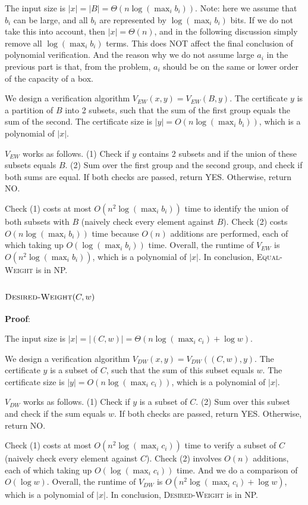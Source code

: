 \documentclass{article}
\begin{document}
The input size is $|x|=|B|=\Theta(n\log(\max_ib_i))$. Note: here we assume that $b_i$ can be large, and all $b_i$ are represented by $\log(\max_ib_i)$ bits. If we do not take this into account, then $|x|=\Theta(n)$, and in the following discussion simply remove all $\log(\max_ib_i)$ terms. This does NOT affect the final conclusion of polynomial verification. And the reason why we do not assume large $a_i$ in the previous part is that, from the problem, $a_i$ should be on the same or lower order of the capacity of a box.

We design a verification algorithm $V_{EW}(x,y)=V_{EW}(B,y)$. The certificate $y$ is a partition of $B$ into 2 subsets, such that the sum of the first group equals the sum of the second. The certificate size is $|y|=O(n\log(\max_ib_i))$, which is a polynomial of $|x|$.

$V_{EW}$ works as follows. (1) Check if $y$ contains 2 subsets and if the union of these subsets equals $B$. (2) Sum over the first group and the second group, and check if both sums are equal. If both checks are passed, return YES. Otherwise, return NO.

Check (1) costs at most $O(n^2\log(\max_ib_i))$ time to identify the union of both subsets with $B$ (naively check every element against $B$). Check (2) costs $O(n\log(\max_ib_i))$ time because $O(n)$ additions are performed, each of which taking up $O(\log(\max_ib_i))$ time. Overall, the runtime of $V_{EW}$ is $O(n^2\log(\max_ib_i))$, which is a polynomial of $|x|$. In conclusion, \textsc{Equal-Weight} is in NP.

\subsubsection{$\textsc{Desired-Weight}(C,w)$}
\noindent\textbf{Proof}:

The input size is $|x|=|(C,w)|=\Theta(n\log(\max_ic_i)+\log w)$.

We design a verification algorithm $V_{DW}(x,y)=V_{DW}((C,w),y)$. The certificate $y$ is a subset of $C$, such that the sum of this subset equals $w$. The certificate size is $|y|=O(n\log(\max_ic_i))$, which is a polynomial of $|x|$.

$V_{DW}$ works as follows. (1) Check if $y$ is a subset of $C$. (2) Sum over this subset and check if the sum equals $w$. If both checks are passed, return YES. Otherwise, return NO.

Check (1) costs at most $O(n^2\log(\max_ic_i))$ time to verify a subset of $C$ (naively check every element against $C$). Check (2) involves $O(n)$ additions, each of which taking up $O(\log(\max_ic_i))$ time. And we do a comparison of $O(\log w)$. Overall, the runtime of $V_{DW}$ is $O(n^2\log(\max_ic_i)+\log w)$, which is a polynomial of $|x|$. In conclusion, \textsc{Desired-Weight} is in NP.
\end{document}
